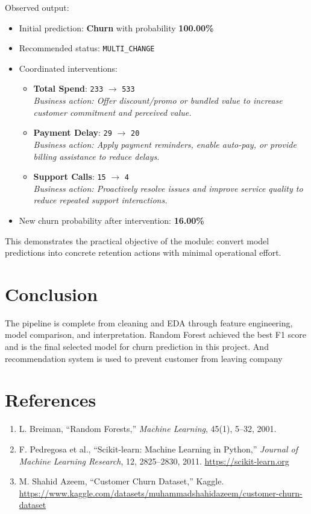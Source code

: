 \documentclass[11pt]{article}
\begin{document}
Observed output:
\begin{itemize}
    \item Initial prediction: \textbf{Churn} with probability \textbf{100.00\%}
    \item Recommended status: \texttt{MULTI\_CHANGE}
    \item Coordinated interventions:
    \begin{itemize}
        \item \textbf{Total Spend}: \texttt{233} $\rightarrow$ \texttt{533} \\
        \textit{Business action: Offer discount/promo or bundled value to increase customer commitment and perceived value.}

        \item \textbf{Payment Delay}: \texttt{29} $\rightarrow$ \texttt{20} \\
        \textit{Business action: Apply payment reminders, enable auto-pay, or provide billing assistance to reduce delays.}

        \item \textbf{Support Calls}: \texttt{15} $\rightarrow$ \texttt{4} \\
        \textit{Business action: Proactively resolve issues and improve service quality to reduce repeated support interactions.}
    \end{itemize}
    \item New churn probability after intervention: \textbf{16.00\%}
\end{itemize}

This demonstrates the practical objective of the module: convert model predictions into concrete retention actions with minimal operational effort.

\section{Conclusion}
The pipeline is complete from cleaning and EDA through feature engineering, model comparison, and interpretation. Random Forest achieved the best F1 score and is the final selected model for churn prediction in this project. And recommendation system is used to prevent customer from leaving company

\section*{References}
\begin{enumerate}
    \item L. Breiman, ``Random Forests,'' \textit{Machine Learning}, 45(1), 5--32, 2001.
    \item F. Pedregosa et al., ``Scikit-learn: Machine Learning in Python,'' \textit{Journal of Machine Learning Research}, 12, 2825--2830, 2011. \url{https://scikit-learn.org}
    \item M. Shahid Azeem, ``Customer Churn Dataset,'' Kaggle. \url{https://www.kaggle.com/datasets/muhammadshahidazeem/customer-churn-dataset}
\end{enumerate}
\end{document}
